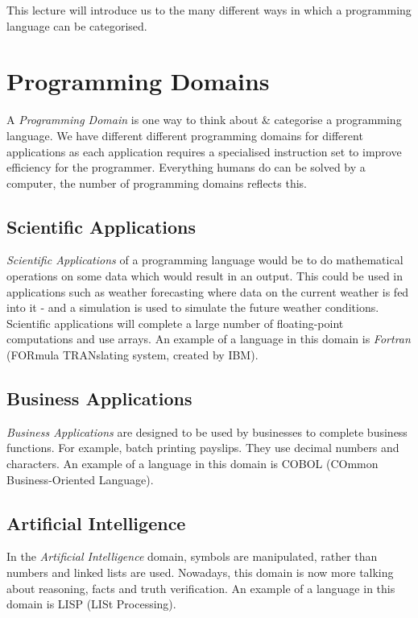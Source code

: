 
This lecture will introduce us to the many different ways in which a programming language can be categorised. 

\section{Programming Domains}
A \textit{Programming Domain} is one way to think about \& categorise a programming language. We have different different programming domains for different applications as each application requires a specialised instruction set to improve efficiency for the programmer. Everything humans do can be solved by a computer, the number of programming domains reflects this.
\subsection{Scientific Applications}
\textit{Scientific Applications} of a programming language would be to do mathematical operations on some data which would result in an output. This could be used in applications such as weather forecasting where data on the current weather is fed into it - and a simulation is used to simulate the future weather conditions. Scientific applications will complete a large number of floating-point computations and use arrays. An example of a language in this domain is \textit{Fortran} (FORmula TRANslating system, created by IBM).

\subsection{Business Applications}
\textit{Business Applications} are designed to be used by businesses to complete business functions. For example, batch printing payslips. They use decimal numbers and characters. An example of a language in this domain is COBOL (COmmon Business-Oriented Language). 

\subsection{Artificial Intelligence}
In the \textit{Artificial Intelligence} domain, symbols are manipulated, rather than numbers and linked lists are used. Nowadays, this domain is now more talking about reasoning, facts and truth verification. An example of a language in this domain is LISP (LISt Processing).

